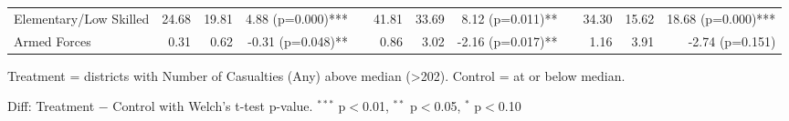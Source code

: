 \begin{table}[htbp]
\begin{tabular}{l rrr c rrr c rrr}
\quad Elementary/Low Skilled & 24.68 & 19.81 & 4.88 (p=0.000)*** &  & 41.81 & 33.69 & 8.12 (p=0.011)** &  & 34.30 & 15.62 & 18.68 (p=0.000)*** \\
\quad Armed Forces & 0.31 & 0.62 & -0.31 (p=0.048)** &  & 0.86 & 3.02 & -2.16 (p=0.017)** &  & 1.16 & 3.91 & -2.74 (p=0.151) \\
\bottomrule
\end{tabular}
\begin{tablenotes}
\small
\item Treatment = districts with Number of Casualties (Any) above median (>202). Control = at or below median.
\item Diff: Treatment $-$ Control with Welch's t-test p-value. $^{{***}}$ p$<$0.01, $^{{**}}$ p$<$0.05, $^{{*}}$ p$<$0.10
\end{tablenotes}
\end{table}

\clearpage

